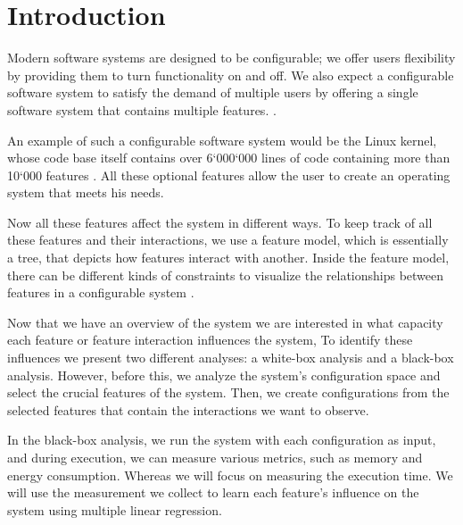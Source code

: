 \chapter{Introduction}\label{ch:introduction}

Modern software systems are designed to be configurable; we offer users flexibility by providing them to turn functionality on and off.
We also expect a configurable software system to satisfy the demand of multiple users by offering a single software system that 
contains multiple features. \cite{Feature-Oriented-Software-Product-Lines}. 

An example of such a configurable software system would be the Linux kernel, whose code base itself contains over 6`000`000 lines of code containing more 
than 10`000 features \cite{Linux-Kernel}. 
All these optional features allow the user to create an operating system that meets his needs. 

Now all these features affect the system in different ways. To keep track of all these features and their interactions, we use a feature model, 
which is essentially a tree, that depicts how features interact with another.
Inside the feature model, there can be different kinds of constraints to visualize the relationships 
between features in a configurable system \cite{Feature-Oriented-Software-Product-Lines}. 

Now that we have an overview of the system we are interested in what capacity each feature or feature interaction influences the system,
To identify these influences we present two different analyses: a white-box analysis and a black-box analysis.
However, before this, we analyze the system's configuration space and select the crucial features of the system.
Then, we create configurations from the selected features that contain the interactions we want to observe.

In the black-box analysis, we run the system with each configuration as input, and during execution, we can measure various metrics, such as memory and energy consumption.
Whereas we will focus on measuring the execution time. We will use the measurement we collect to learn each feature's influence on the system 
using multiple linear regression.

